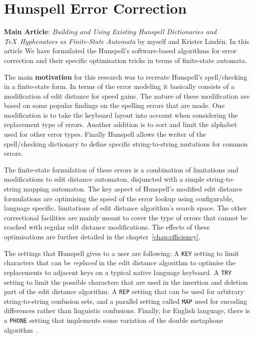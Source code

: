 \documentclass[officiallayout]{unihelcompling}
\begin{document}
\section{Hunspell Error Correction}
\label{sec:Hunspell-error}

\textbf{Main Article}: \emph{Building and Using Existing Hunspell Dictionaries
and \TeX\ Hyphenators as Finite-State Automata} by myself and Krister Lindén.
In this article We have formulated the Hunspell's software-based algorithms for
error correction and their specific optimisation tricks in terms of
finite-state automata.

The main \textbf{motivation} for this research was to recreate Hunspell's
spell\-/checking in a finite-state form. In terms of the  error modeling it
basically consists of a modification of edit distance for speed gains. The
nature of these modification are based on some popular findings on the spelling
errors that are made. One modification is to take the keyboard layout into
account when considering the replacement type of errors. Another addition is to
sort and limit the alphabet used for other error types. Finally Hunspell allows
the writer of the spell\-/checking dictionary to define specific string-to-string
mutations for common errors.

The finite-state formulation of these errors is a combination of limitations
and modifications to edit distance automaton, disjuncted with a simple
string-to-string mapping automaton. The key aspect of Hunspell's modified
edit distance formulations are optimising the speed of the error lookup using
configurable, language specific, limitations of edit distance algorithm's
search space. The other correctional facilities are mainly meant to cover the
type of errors that cannot be reached with regular edit distance modifications.
The effects of these optimisations are further detailed in the 
chapter~\ref{chap:efficiency}.

The settings that Hunspell gives to a user are following: A \texttt{KEY}
setting to limit characters that can be \emph{replaced} in the edit distance
algorithm to optimise the replacements to adjacent keys on a typical native
language keyboard. A \texttt{TRY} setting to limit the possible characters
that are used in the insertion and deletion part of the edit distance
algorithm. A \texttt{REP} setting that can be used for arbitrary
string-to-string confusion sets, and a parallel setting called \texttt{MAP}
used for encoding differences rather than linguistic confusions.  Finally, for
English language, there is a \texttt{PHONE} setting that implements some
variation of the double metaphone algorithm~\citep{philips2000double}.
\end{document}
